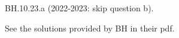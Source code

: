 

\setcounter{theorem}{22}
\begin{exercise}
BH.10.23.a (2022-2023: skip question b).
\begin{solution}
See the solutions provided by BH in their pdf.

\end{solution}
\end{exercise}



